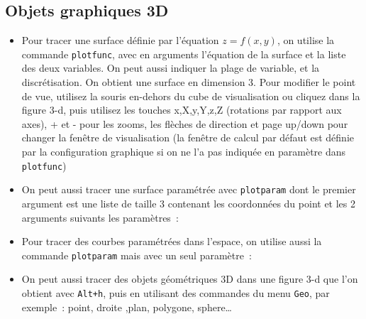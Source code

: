 \documentclass{article}
\begin{document}
\begin{giacjshere}
\subsection{Objets graphiques 3D}
%
\begin{itemize}
\item Pour tracer une surface d\'efinie par l'\'equation
$z=f(x,y)$, on utilise la commande \verb|plotfunc|, avec
en arguments l'\'equation de la surface et la liste des deux variables.
On peut aussi indiquer la plage de variable, et la discr\'etisation.
On obtient une surface en dimension 3.
Pour modifier le point de vue, utilisez la souris en-dehors du cube de visualisation
ou cliquez dans la figure 3-d, puis
utilisez les touches x,X,y,Y,z,Z (rotations par rapport aux axes), 
+ et - pour les zooms, 
les fl\`eches de direction et page up/down pour changer la
fen\^etre de visualisation (la fen\^etre de calcul par d\'efaut est 
d\'efinie par la configuration graphique si on ne l'a pas indiqu\'ee
en param\`etre dans \verb|plotfunc|)
\item On peut aussi tracer une surface param\'etr\'ee
avec \verb|plotparam| dont le premier
argument est une liste de taille 3 contenant les coordonn\'ees du point
et les 2 arguments suivants les param\`etres~:
\item Pour tracer des courbes param\'etr\'ees dans l'espace, on utilise
aussi la commande \verb|plotparam| mais avec un seul param\`etre~:
\item On peut aussi tracer des objets g\'eom\'etriques 3D dans une figure 3-d que l'on 
obtient avec {\tt Alt+h}, puis en utilisant des commandes du menu \verb|Geo|, par exemple~:
point, droite ,plan, polygone, sphere\ldots
{}
\end{itemize}



\end{giacjshere}
\end{document}
